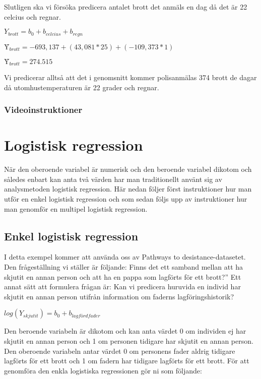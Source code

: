 \documentclass[
]{book}
\begin{document}
Slutligen ska vi försöka predicera antalet brott det anmäls en dag då det är 22 celcius och regnar.

\(Y_{brott} = b_0 + b_{celcius} + b_{regn}\)

\(Ŷ_{brott} = -693,137 + (43,081*25) + (-109,373*1)\)

\(Ŷ_{brott} = 274.515\)

Vi predicerar alltså att det i genomsnitt kommer polisanmälas 374 brott de dagar då utomhustemperaturen är 22 grader och regnar.

\hypertarget{videoinstruktioner-11}{%
\subsection{Videoinstruktioner}\label{videoinstruktioner-11}}

\hypertarget{logistisk-regression}{%
\chapter{Logistisk regression}\label{logistisk-regression}}

När den oberoende variabel är numerisk och den beroende variabel dikotom och således enbart kan anta två värden har man traditionellt använt sig av analysmetoden logistisk regression.
Här nedan följer först instruktioner hur man utför en enkel logistisk regression och som sedan följs upp av instruktioner hur man genomför en multipel logistisk regression.

\hypertarget{enkel-logistisk-regression}{%
\section{Enkel logistisk regression}\label{enkel-logistisk-regression}}

I detta exempel kommer att använda oss av Pathways to desistance-datasetet. Den frågeställning vi ställer är följande: Finns det ett samband mellan att ha skjutit en annan person och att ha en pappa som lagförts för ett brott?'' Ett annat sätt att formulera frågan är: Kan vi predicera huruvida en individ har skjutit en annan person utifrån information om faderns lagföringshistorik?

\(log(Y_{skjutit}) = b_0 + b_{lagfördfader}\)

Den beroende variabeln är dikotom och kan anta värdet 0 om individen ej har skjutit en annan person och 1 om personen tidigare har skjutit en annan person. Den oberoende variabeln antar värdet 0 om personens fader aldrig tidigare lagförts för ett brott och 1 om fadern har tidigare lagförts för ett brott. För att genomföra den enkla logistiska regressionen gör ni som följande:
\end{document}

